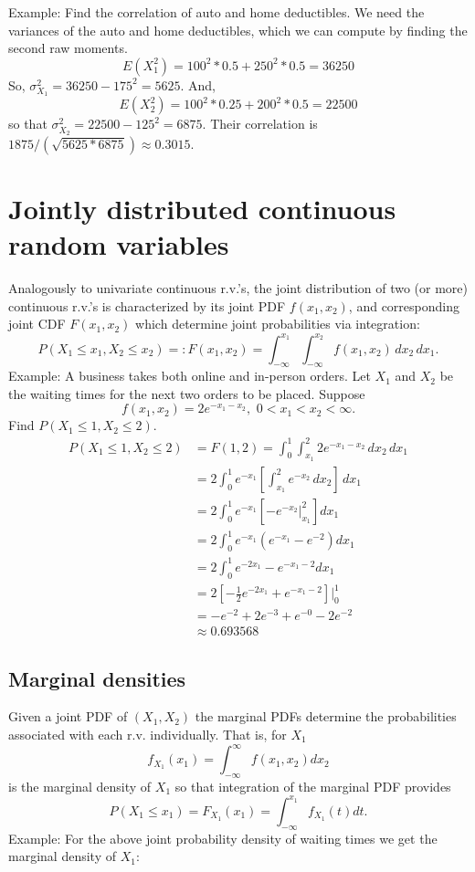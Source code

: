 \documentclass[]{book}
\begin{document}
Example: Find the correlation of auto and home deductibles. We need the
variances of the auto and home deductibles, which we can compute by
finding the second raw moments.
\[E(X_1^2) = 100^2*0.5 + 250^2 * 0.5 = 36250\] So,
\(\sigma_{X_1}^2 = 36250-175^2 = 5625\). And,
\[E(X_2^2) = 100^2*0.25 + 200^2 * 0.5 = 22500\] so that
\(\sigma_{X_2}^2 = 22500 - 125^2 = 6875\). Their correlation is
\(1875/(\sqrt{5625*6875}) \approx 0.3015\).

\section{Jointly distributed continuous random
variables}\label{jointly-distributed-continuous-random-variables}

Analogously to univariate continuous r.v.'s, the joint distribution of
two (or more) continuous r.v.'s is characterized by its joint PDF
\(f(x_1, x_2)\), and corresponding joint CDF \(F(x_1, x_2)\) which
determine joint probabilities via integration:
\[P(X_1\leq x_1, X_2\leq x_2) =: F(x_1,x_2) = \int_{-\infty}^{x_1}\int_{-\infty}^{x_2}f(x_1,x_2)\,dx_2\,dx_1.\]
Example: A business takes both online and in-person orders. Let \(X_1\)
and \(X_2\) be the waiting times for the next two orders to be placed.
Suppose \[f(x_1,x_2) = 2e^{-x_1-x_2}, \,\,0<x_1<x_2<\infty.\] Find
\(P(X_1\leq 1, X_2\leq 2)\).\\

\begin{align*}
P(X_1\leq 1, X_2\leq 2) &= F(1,2) = \int_0^1\int_{x_1}^2 2e^{-x_1-x_2} \,dx_2\, dx_1\\
& = 2\int_0^1 e^{-x_1}\left[\int_{x_1}^2 e^{-x_2} \,dx_2\right]\, dx_1\\
& = 2\int_0^1 e^{-x_1} \left[ - e^{-x_2}|_{x_1}^2\right]dx_1\\
& = 2\int_0^1 e^{-x_1}(e^{-x_1} - e^{-2})dx_1\\
& = 2\int_0^1 e^{-2x_1} - e^{-x_1-2}dx_1\\
& = 2[-\tfrac12 e^{-2x_1} + e^{-x_1-2}]|_{0}^1\\
& = -e^{-2}+2e^{-3}+e^{-0}-2e^{-2}\\
& \approx 0.693568
\end{align*}

\subsection{Marginal densities}\label{marginal-densities}

Given a joint PDF of \((X_1, X_2)\) the marginal PDFs determine the
probabilities associated with each r.v. individually. That is, for
\(X_1\) \[f_{X_1}(x_1) = \int_{-\infty}^\infty f(x_1, x_2) dx_2\] is the
marginal density of \(X_1\) so that integration of the marginal PDF
provides
\[P(X_1\leq x_1) = F_{X_1}(x_1) = \int_{-\infty}^{x_1} f_{X_1}(t)dt.\]
Example: For the above joint probability density of waiting times we get
the marginal density of \(X_1\):
\end{document}
